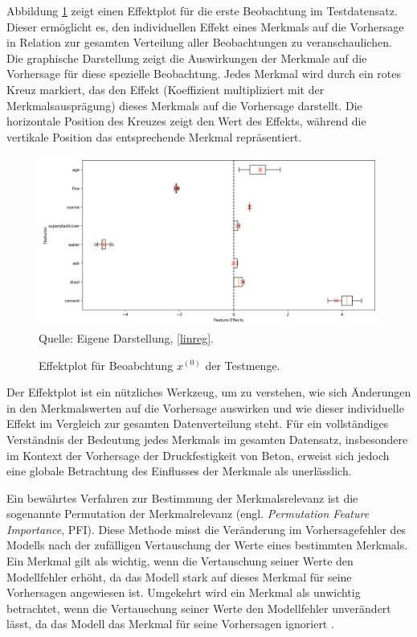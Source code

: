 Abbildung \ref{pic:effect} zeigt einen Effektplot für die erste Beobachtung im Testdatensatz. Dieser 
ermöglicht es, den individuellen Effekt eines Merkmals auf die Vorhersage in Relation zur gesamten 
Verteilung aller Beobachtungen zu veranschaulichen. Die graphische Darstellung zeigt die Auswirkungen 
der Merkmale auf die Vorhersage für diese spezielle Beobachtung. 
Jedes Merkmal wird durch ein rotes Kreuz markiert, das den Effekt (Koeffizient multipliziert mit der Merkmalsausprägung) dieses 
Merkmals auf die Vorhersage darstellt. 
Die horizontale Position des Kreuzes zeigt den Wert des Effekts, während die vertikale Position das entsprechende Merkmal repräsentiert.

\begin{figure}[!h]
    \caption{Effektplot für Beoabchtung $x^{(0)}$ der Testmenge.}
    \includegraphics[width=1\textwidth]{../scripts/images/feature_effects_boxplot.png}
    Quelle: Eigene Darstellung, \ref{linreg}.
    \label{pic:effect}
\end{figure}

Der Effektplot ist ein nützliches Werkzeug, um zu verstehen, wie sich Änderungen in den Merkmalswerten auf die Vorhersage 
auswirken und wie dieser individuelle Effekt im Vergleich zur gesamten Datenverteilung steht. Für ein vollständiges Verständnis 
der Bedeutung jedes Merkmals im gesamten Datensatz, insbesondere im Kontext der Vorhersage der Druckfestigkeit von Beton, 
erweist sich jedoch eine globale Betrachtung des Einflusses der Merkmale als unerlässlich.

Ein bewährtes Verfahren zur Bestimmung der 
Merkmalsrelevanz ist die sogenannte Permutation der Merkmalrelevanz (engl. \textit{Permutation Feature Importance}, PFI). 
Diese Methode misst die Veränderung im Vorhersagefehler des Modells nach der 
zufälligen Vertauschung der Werte eines bestimmten Merkmals. 
Ein Merkmal gilt als wichtig, wenn die Vertauschung seiner Werte den Modellfehler erhöht, 
da das Modell stark auf dieses Merkmal für seine Vorhersagen angewiesen ist. 
Umgekehrt wird ein Merkmal als unwichtig betrachtet, wenn die Vertauschung seiner Werte 
den Modellfehler unverändert lässt, da das Modell das Merkmal für seine Vorhersagen ignoriert \cite[S. 157]{Molnar_2022}. 

